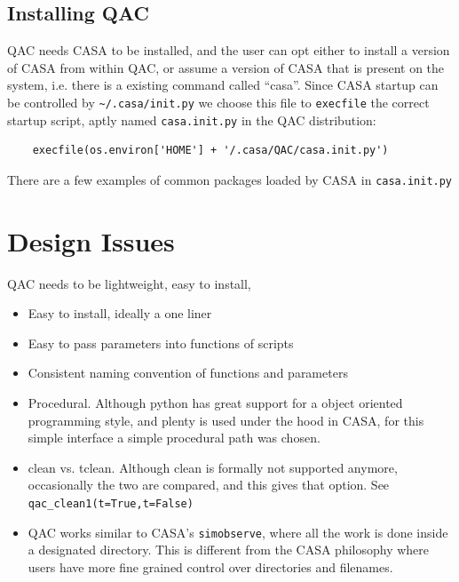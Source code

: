 \documentclass[11pt,twoside]{article}
\begin{document}
\subsection{Installing QAC}

QAC needs CASA to be installed, and the user can opt either to install a version
of CASA from within QAC, or assume a version of CASA that is present on the system, i.e. there
is a existing command called ``casa''. Since CASA startup can be controlled by
\verb+~/.casa/init.py+ we choose this file to {\tt execfile} the correct startup script,
aptly named {\tt casa.init.py} in the QAC distribution:


\begin{verbatim}
    execfile(os.environ['HOME'] + '/.casa/QAC/casa.init.py')
\end{verbatim}

\noindent
There are a few examples of common packages loaded by CASA in {\tt casa.init.py}

\section{Design Issues}

QAC needs to be lightweight, easy to install,

\begin{itemize}

\item
  Easy to install, ideally a one liner

\item
  Easy to pass parameters into functions of scripts

\item
  Consistent naming convention of functions and parameters

\item
  Procedural. Although python has great support for a object oriented
  programming style, and plenty is used under the hood in CASA, for
  this simple interface a simple procedural path was chosen.

\item
  clean vs. tclean. Although clean is formally not supported anymore, occasionally the two are compared, and
  this gives that option. See \verb+qac_clean1(t=True,t=False)+

\item
  QAC works similar to CASA's \verb+simobserve+, where all the work is done inside a designated directory. This is
  different from the CASA philosophy where users have more fine grained control over directories and filenames.
  
\end{itemize}
\end{document}
